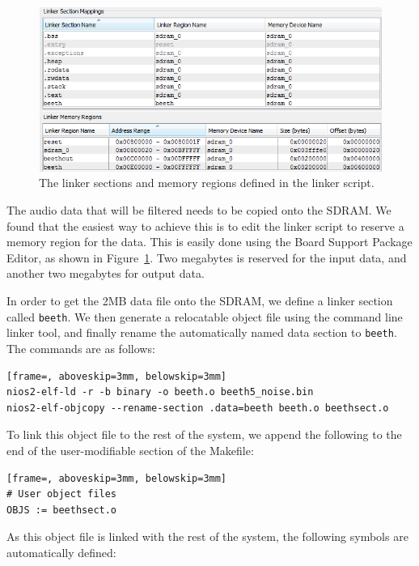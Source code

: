 \documentclass[]{article}
\begin{document}
\begin{figure}[btp]
	\begin{center}
		\includegraphics[width = \textwidth]{linkersections.PNG}
	\end{center}
	\caption{The linker sections and memory regions defined in the linker script.}
	\label{fig:linkersections}
\end{figure}

The audio data that will be filtered needs to be copied onto the SDRAM. We found that the easiest way to achieve this is to edit the linker script to reserve a memory region for the data. This is easily done using the Board Support Package Editor, as shown in Figure~\ref{fig:linkersections}.
Two megabytes is reserved for the input data, and another two megabytes for output data.

In order to get the 2MB data file onto the SDRAM, we define a linker section called \verb"beeth". We then generate a relocatable object file using the command line linker tool, and finally rename the automatically named data section to \verb"beeth".
The commands are as follows:

\begin{lstlisting}[frame=, aboveskip=3mm, belowskip=3mm]
nios2-elf-ld -r -b binary -o beeth.o beeth5_noise.bin
nios2-elf-objcopy --rename-section .data=beeth beeth.o beethsect.o
\end{lstlisting}

To link this object file to the rest of the system, we append the following to the end of the user-modifiable section of the Makefile:

\begin{lstlisting}[frame=, aboveskip=3mm, belowskip=3mm]
# User object files
OBJS := beethsect.o
\end{lstlisting}

As this object file is linked with the rest of the system, the following symbols are automatically defined:
\end{document}
